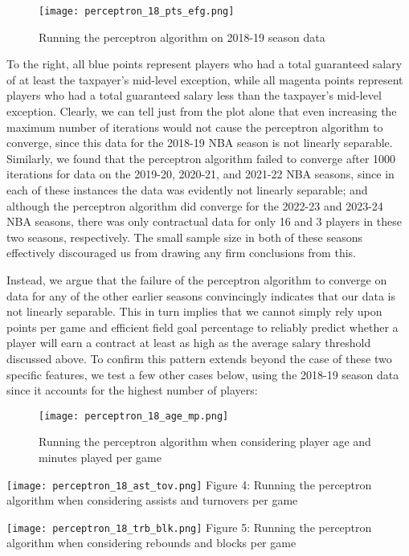 \documentclass{article}
\begin{document}
\begin{wrapfigure}{r}{0.5\textwidth}
    \centering
    \texttt{[image: perceptron\_18\_pts\_efg.png]}
    \caption{Running the perceptron algorithm on 2018-19 season data}
\end{wrapfigure}

To the right, all blue points represent players who had a total guaranteed salary of at least the taxpayer's mid-level exception, while all magenta points represent players who had a total guaranteed salary less than the taxpayer's mid-level exception. Clearly, we can tell just from the plot alone that even increasing the maximum number of iterations would not cause the perceptron algorithm to converge, since this data for the 2018-19 NBA season is not linearly separable. Similarly, we found that the perceptron algorithm failed to converge after 1000 iterations for data on the 2019-20, 2020-21, and 2021-22 NBA seasons, since in each of these instances the data was evidently not linearly separable; and although the perceptron algorithm did converge for the 2022-23 and 2023-24 NBA seasons, there was only contractual data for only 16 and 3 players in these two seasons, respectively. The small sample size in both of these seasons effectively discouraged us from drawing any firm conclusions from this.

Instead, we argue that the failure of the perceptron algorithm to converge on data for any of the other earlier seasons convincingly indicates that our data is not linearly separable. This in turn implies that we cannot simply rely upon points per game and efficient field goal percentage to reliably predict whether a player will earn a contract at least as high as the average salary threshold discussed above. To confirm this pattern extends beyond the case of these two specific features, we test a few other cases below, using the 2018-19 season data since it accounts for the highest number of players:

\begin{figure}[h]
    \centering
    \texttt{[image: perceptron\_18\_age\_mp.png]}
    \caption{Running the perceptron algorithm when considering player age and minutes played per game}
\end{figure}
  \begin{minipage}[b]{0.4\textwidth}
    \texttt{[image: perceptron\_18\_ast\_tov.png]}
    Figure 4: Running the perceptron algorithm when considering assists and turnovers per game\\
  \end{minipage}
  \hfill
  \begin{minipage}[b]{0.4\textwidth}
    \texttt{[image: perceptron\_18\_trb\_blk.png]}
    Figure 5: Running the perceptron algorithm when considering rebounds and blocks per game\\
  \end{minipage}
\end{document}
